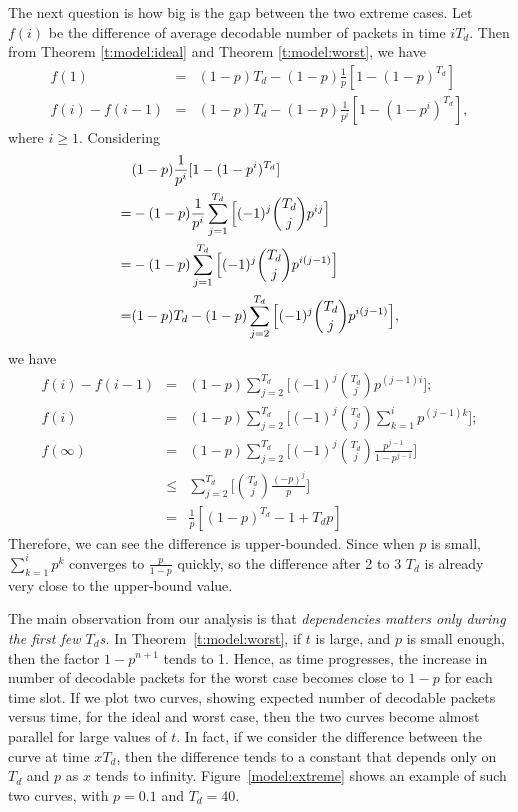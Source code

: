     The next question is how big is the
    gap between the two extreme cases.
    Let $f(i)$ be the difference of average decodable number of packets in time $iT_d$. Then
    from Theorem \ref{t:model:ideal} and Theorem \ref{t:model:worst}, we have
    \begin{eqnarray*}
    f(1)         &=& (1-p)T_d - (1-p)\frac{1}{p}[1-(1-p)^{T_d}]\\
        f(i)-f(i-1)  &=& (1-p)T_d - (1-p)\frac{1}{p^i}[1-(1-p^i)^{T_d}],
    \end{eqnarray*}
    where $i \geq 1$. Considering 
    \begin{eqnarray*}
        &(1-p)\dfrac{1}{p^i}[1-(1 - p^i)^{T_d}]\\
        =&-(1-p)\dfrac{1}{p^i}\displaystyle\sum_{j=1}^{T_d}\Big[(-1)^j\dbinom{T_d}{j}p^{ij}\Big]\\
        =&-(1-p)\displaystyle\sum_{j=1}^{T_d}\Big[(-1)^j\dbinom{T_d}{j}p^{i(j-1)}\Big]\\
        =& (1-p)T_d - (1-p)\displaystyle\sum_{j=2}^{T_d}\Big[(-1)^j\dbinom{T_d}{j}p^{i(j-1)}\Big],
    \end{eqnarray*}
    we have
    \begin{eqnarray*}
    f(i) - f(i-1) &=& (1-p)\sum_{j=2}^{T_d}\Big[(-1)^j\binom{T_d}{j}p^{(j-1)i}\Big];\\
    f(i)          &=& (1-p)\sum_{j=2}^{T_d}\Big[(-1)^{j}\binom{T_d}{j}\sum_{k=1}^i p^{(j - 1)k}\Big];\\
    f(\infty)     &=& (1-p)\sum_{j=2}^{T_d}\Big[(-1)^{j}\binom{T_d}{j}\frac{p^{j-1}}{1-p^{j-1}}\Big]\\
                  &\leq& \sum_{j=2}^{T_d}\Big[\binom{T_d}{j}\frac{(-p)^{j}}{p}\Big]\\ 
                  &=& \frac{1}{p}[(1 - p)^{T_d} - 1 + T_{d}p]
    \end{eqnarray*}
    Therefore, we can see the difference is upper-bounded.
    Since when $p$ is small, $\sum_{k=1}^i p^k$ converges to $\frac{p}{1-p}$ quickly,
    so the difference after 2 to 3 $T_d$ is already very close to the upper-bound value.
    
    
    The main observation from our analysis is that \textit{
    dependencies matters only during the first few $T_d$s.}
    In Theorem~\ref{t:model:worst}, if $t$ is large, and $p$ is small
    enough, then the factor $1-p^{n+1}$ tends to 1.  Hence, as
    time progresses, the increase in number of decodable packets
    for the worst case becomes close to $1-p$ for each time slot.
    If we plot two curves, showing expected number of decodable
    packets versus time, for the ideal and worst case, then the
    two curves become almost parallel for large values of $t$.  In fact,
    if we consider the difference between the curve at time $xT_d$,
    then the difference tends to a constant that depends only on
    $T_d$ and $p$ as $x$ tends to infinity.
    Figure~\ref{model:extreme} shows an example of such two curves, with
    $p = 0.1$ and $T_d = 40$.

